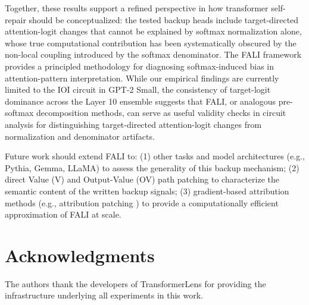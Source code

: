 \documentclass[12pt,a4paper]{article}
\begin{document}
Together, these results support a refined perspective in how transformer
self-repair should be conceptualized: the tested backup heads include target-directed
attention-logit changes that cannot be explained by softmax normalization alone,
whose true computational contribution has been systematically
obscured by the non-local coupling introduced by the softmax denominator. The FALI framework provides a principled methodology for diagnosing softmax-induced bias in attention-pattern interpretation. While our empirical findings are currently limited to the IOI circuit in GPT-2 Small, the consistency of target-logit dominance across the Layer 10 ensemble suggests that FALI, or analogous pre-softmax decomposition methods, can serve as useful validity checks in circuit analysis for distinguishing target-directed attention-logit changes from normalization and denominator artifacts.

Future work should extend FALI to: (1) other tasks and model architectures
(e.g., Pythia, Gemma, LLaMA) to assess the generality of this backup mechanism;
(2) direct Value (V) and Output-Value (OV) path patching to characterize the
semantic content of the written backup signals; (3) gradient-based attribution
methods (e.g., attribution patching \citep{nanda2023attribution}) to provide a
computationally efficient approximation of FALI at scale.

\section*{Acknowledgments}

The authors thank the developers of TransformerLens \citep{nanda2022transformerlens}
for providing the infrastructure underlying all experiments in this work.



\end{document}
